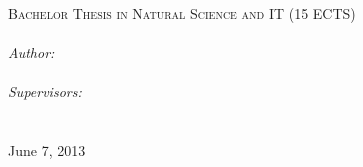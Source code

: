 \documentclass[11pt, a4paper, oneside]{Thesis} %
\title{\ttitle} %
\begin{document}
\frontmatter %


\fancyhead{} %
\rhead{\thepage} %
\lhead{} %

\pagestyle{fancy} %

\newcommand{\HRule}{\rule{\linewidth}{0.5mm}} %

\hypersetup{pdfsubject=\subjectname}
\hypersetup{pdfauthor=\authornames}
\hypersetup{pdfkeywords=\keywordnames}



\begin{titlepage}

%                          
% 
\vspace*{5cm}
\textsc{\Large Bachelor Thesis in Natural Science and IT (15 ECTS)}\\[0.5cm] %

{\huge \bfseries \ttitle}\\[1cm] %
\large
\emph{Author:}\\
{\authornames}\\[0.5cm] %
\emph{Supervisors:} \\
{\supname}\\[8.5cm] %

\deptname\\ %
{\large June 7, 2013} %
 
\vfill

\end{titlepage}
\end{document}

